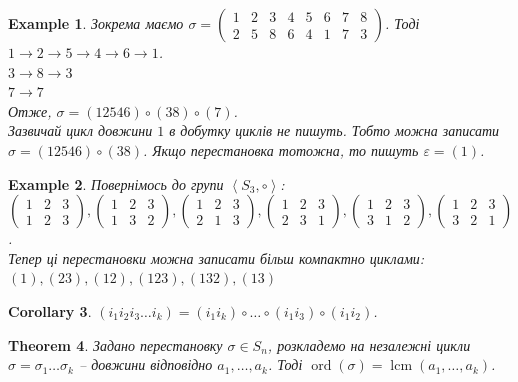 \documentclass[a4paper, 10pt]{article}
\theoremstyle{theoremdd}
\newtheorem{theorem}{Theorem}[subsection]
\theoremstyle{theoremdd}
\theoremstyle{theoremdd}
\theoremstyle{theoremdd}
\theoremstyle{theoremdd}
\newtheorem{example}[theorem]{Example}
\theoremstyle{theoremdd}
\theoremstyle{theoremdd}
\theoremstyle{theoremdd}
\theoremstyle{theoremdd}
\theoremstyle{theoremdd}
\theoremstyle{theoremdd}
\theoremstyle{theoremdd}
\theoremstyle{theoremdd}
\theoremstyle{theoremdd}
\newtheorem{corollary}[theorem]{Corollary}
\theoremstyle{theoremdd}
\DeclareMathOperator{\ord}{ord}
\DeclareMathOperator{\lcm}{lcm}
\begin{document}
\begin{example}
Зокрема маємо $\sigma = \begin{pmatrix}
1 & 2 & 3 & 4 & 5 & 6 & 7 & 8 \\
2 & 5 & 8 & 6 & 4 & 1 & 7 & 3
\end{pmatrix}$. Тоді\\
$1 \to 2 \to 5 \to 4 \to 6 \to 1$.\\
$3 \to 8 \to 3$\\
$7 \to 7$\\
Отже, $\sigma = (12546) \circ (38) \circ (7)$.\\
\textit{Зазвичай цикл довжини $1$ в добутку циклів не пишуть. Тобто можна записати $\sigma = (12546) \circ (38)$. Якщо перестановка тотожна, то пишуть $\varepsilon = (1)$.}
\end{example}

\begin{example}
Повернімось до групи $\left< S_3, \circ \right>$:\\
$\begin{pmatrix}
1 & 2 & 3 \\
1 & 2 & 3
\end{pmatrix}, \begin{pmatrix}
1 & 2 & 3 \\
1 & 3 & 2
\end{pmatrix}, \begin{pmatrix}
1 & 2 & 3 \\
2 & 1 & 3
\end{pmatrix}, \begin{pmatrix}
1 & 2 & 3 \\
2 & 3 & 1
\end{pmatrix}, \begin{pmatrix}
1 & 2 & 3 \\
3 & 1 & 2
\end{pmatrix}, \begin{pmatrix}
1 & 2 & 3 \\
3 & 2 & 1
\end{pmatrix}$.\\
Тепер ці перестановки можна записати більш компактно циклами:\\
$(1), (23), (12), (123), (132), (13)$
\end{example}

\begin{corollary}
$(i_1 i_2 i_3\dots i_k) = (i_1 i_k) \circ \dots \circ (i_1 i_3) \circ (i_1 i_2)$.
\end{corollary}

\begin{theorem}
Задано перестановку $\sigma \in S_n$, розкладемо на незалежні цикли $\sigma = \sigma_1 \dots \sigma_k$ -- довжини відповідно $a_1,\dots,a_k$. Тоді $\ord (\sigma) = \lcm(a_1,\dots,a_k)$.
\end{theorem}
\end{document}
